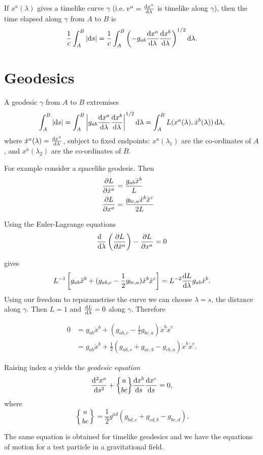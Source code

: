 \documentclass{notes}
\newcommand{\dif}[1]{\frac{\ud\phantom{#1}}{\ud#1}}
\newcommand{\ch}[2]{\genfrac{\{}{\}}{0pt}{}{#1}{#2}}
\begin{document}
If $x^a(\lambda)$ gives a timelike curve $\gamma$ (i.e.
$v^a=\frac{\mathrm{d} x^a}{\mathrm{d}\lambda}$ is timelike along $\gamma$), then the time
elapsed along $\gamma$ from $A$ to $B$ is
\[
\frac{1}{c}\int_A^B \left|\mathrm{d} s\right| =\frac{1}{c} \int_A^B \left( - g_{a
    b} \frac{\mathrm{d} x^a}{\mathrm{d}\lambda}\frac{\mathrm{d} x^b}{\mathrm{d}\lambda} \right)^{1/2}
\mathrm{d}\lambda.
\]

\section{Geodesics}

A geodesic $\gamma$ from $A$ to $B$ extremises 
\[
\int_A^B \left|\mathrm{d} s\right| = \int_A^B \left|g_{a b}  \frac{\mathrm{d} x^a}{\mathrm{d}\lambda}
\frac{\mathrm{d} x^b}{\mathrm{d}\lambda}\right|^{1/2} \mathrm{d} \lambda =
\int_A^B L(x^a(\lambda), \dot x^b(\lambda))\, \mathrm{d} \lambda,
\]
where
$\dot x^a(\lambda)=\frac{\mathrm{d} x^a}{\mathrm{d}\lambda}$, subject to fixed
endpoints: $x^a(\lambda_1)$ are the co-ordinates of $A$, and
$x^a(\lambda_2)$ are the co-ordinates of $B$. 

For example consider a spacelike geodesic.  Then
\begin{align*}
\frac{\partial L}{\partial \dot x^a} &= \frac{g_{a b} \dot x^b}{L}\cr
\frac{\partial L}{\partial x^a} &= \frac{g_{bc,a} \dot x^b \dot x^c}{2L}
\end{align*}

Using the Euler-Lagrange equations
\[
\dif{\lambda} \left ( \pd{L}{\dot x^a} \right)-\pd{L}{x^a} = 0
\]

gives 
\[
L^{-1} \left [ g_{a b} \ddot x^b + (g_{a b,c}-\frac{1}{2}
  g_{b c,a}) \dot x^b \dot x^c \right] =
L^{-2} \frac{\mathrm{d} L}{\mathrm{d}\lambda} g_{a b} \dot x^b.
\]
Using our freedom to reparametrise the curve we can choose
$\lambda=s$, the distance along $\gamma$.  Then $L=1$
and $\frac{\mathrm{d} L}{\mathrm{d}\lambda}=0$ along $\gamma$.  Therefore

\begin{align*}
0 &= g_{a b}\ddot x^b + ( g_{a b,c} -\frac{1}{2} g_{bc,
a}) \dot x^b \dot x^c \\
&=  g_{a b}\ddot x^b + \frac{1}{2} ( g_{a b,c}+
g_{a c,b}-g_{c b,a}) \dot x^b \dot x^c.
\end{align*}

Raising index $a$ yields the \emph{geodesic equation}
\[
\frac{\ud^2 x^a}{\ud s^2} + \ch{a}{bc}
\diff{x^b}{s}\diff{x^c}{s} = 0,
\]
where
\[
\ch{a}{b c} = \frac{1}{2} g^{ad} ( g_{bd,c}+
g_{cd,b}-g_{b c,d} ).
\]

The same equation is obtained for timelike geodesics and we have the
equations of motion for a test particle in a gravitational field.
\end{document}
